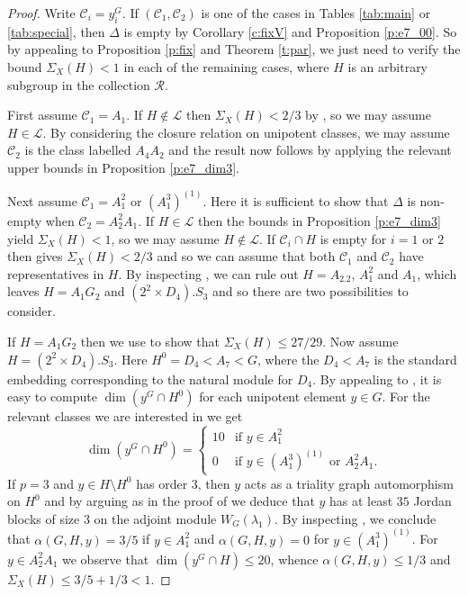 \documentclass[twoside,a4paper,reqno,11pt]{amsart}
\renewcommand{\a}{\alpha}
\renewcommand{\l}{\lambda}
\newcommand{\<}{\langle}
\renewcommand{\>}{\rangle}
\newcommand{\leqs}{\leqslant}
\renewcommand{\:}{\colon}
\theoremstyle{plain}
\theoremstyle{definition}
\begin{document}
\begin{proof}
Write $\mathcal{C}_i = y_i^G$. If $(\mathcal{C}_1,\mathcal{C}_2)$ is one of the cases in Tables \ref{tab:main} or \ref{tab:special}, then $\Delta$ is empty by Corollary \ref{c:fixV} and Proposition \ref{p:e7_00}. So by appealing to Proposition \ref{p:fix} and Theorem \ref{t:par}, we just need to verify the bound $\Sigma_X(H) <1$ in each of the remaining cases, where $H$ is an arbitrary subgroup in the collection $\mathcal{R}$. 

First assume $\mathcal{C}_1 = A_1$. If $H \not\in \mathcal{L}$ then $\Sigma_X(H) < 2/3$ by \cite[Theorem 3.1]{BGG1}, so we may assume $H \in \mathcal{L}$. By considering the closure relation on unipotent classes, we may assume $\mathcal{C}_2$ is the class labelled $A_4A_2$ and the result now follows by applying the relevant upper bounds in Proposition \ref{p:e7_dim3}. 

Next assume $\mathcal{C}_1 = A_1^2$ or $(A_1^3)^{(1)}$. Here it is sufficient to show that $\Delta$ is non-empty when $\mathcal{C}_2 = A_2^2A_1$. If $H \in \mathcal{L}$ then the bounds in Proposition \ref{p:e7_dim3} yield $\Sigma_X(H)<1$, so we may assume $H \not\in \mathcal{L}$. If $\mathcal{C}_i \cap H$ is empty for $i=1$ or $2$ then \cite[Theorem 3.1]{BGG1} gives $\Sigma_X(H)<2/3$ and so we can assume that both $\mathcal{C}_1$ and $\mathcal{C}_2$ have representatives in $H$. By inspecting \cite{Law2}, we can rule out $H = A_2.2$, $A_1^2$ and $A_1$, which leaves $H = A_1G_2$ and $(2^2 \times D_4).S_3$ and so there are two possibilities to consider.

If $H = A_1G_2$ then we use \cite[Section 5.9]{Law2} to show that $\Sigma_X(H) \leqs 27/29$. Now assume $H = (2^2 \times D_4).S_3$. Here $H^0 = D_4 < A_7<G$, where the $D_4<A_7$ is the standard embedding corresponding to the natural module for $D_4$. By appealing to \cite[Section 4.11]{Law2}, it is easy to compute $\dim(y^G \cap H^0)$ for each unipotent element $y \in G$. For the relevant classes we are interested in we get 
\[
\dim(y^G \cap H^0) = \left\{\begin{array}{ll}
10 & \mbox{if $y \in A_1^2$} \\
0 & \mbox{if $y \in (A_1^3)^{(1)}$ or $A_2^2A_1$.}
\end{array}\right.
\]
If $p=3$ and $y \in H \setminus H^0$ has order $3$, then $y$ acts as a triality graph automorphism on $H^0$ and by arguing as in the proof of \cite[Lemma 3.18]{BGG1} we deduce that $y$ has at least $35$ Jordan blocks of size $3$ on the adjoint module $W_G(\l_1)$. By inspecting \cite[Table 8]{Law1}, we conclude that $\a(G,H,y) = 3/5$ if $y \in A_1^2$ and $\a(G,H,y) = 0$ for $y \in (A_1^3)^{(1)}$. For $y \in A_2^2A_1$ we observe that $\dim(y^G \cap H) \leqs 20$, whence $\a(G,H,y) \leqs 1/3$ and $\Sigma_X(H) \leqs 3/5+1/3 <1$. 


\end{proof}
\end{document}
